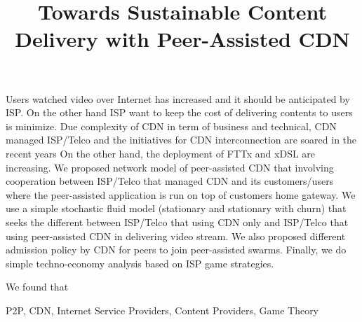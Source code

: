 \documentclass[paper]{ieice}
\title{Towards Sustainable Content Delivery with Peer-Assisted CDN}
\begin{document}
\maketitle

\begin{summary}
Users watched video over Internet has increased and it should be anticipated by ISP.  
On the other hand ISP want to keep the cost of delivering contents to users is minimize.
Due complexity of CDN in term of business and technical, CDN managed ISP/Telco and the initiatives for CDN interconnection are soared in the recent years
On the other hand, the deployment of FTTx and xDSL are increasing.  
We proposed network model of peer-assisted CDN that involving cooperation between ISP/Telco that managed CDN and its customers/users where the peer-assisted application is run on top of customers home gateway.  
We use a simple stochastic fluid model (stationary and stationary with churn) that seeks the different between ISP/Telco that using CDN only and ISP/Telco that using peer-assisted CDN in delivering video stream. We also proposed different admission policy by CDN for peers to join peer-assisted swarms.  
Finally, we do simple techno-economy analysis based on ISP game strategies. 

We found that 


\end{summary}
\begin{keywords}
P2P, CDN, Internet Service Providers, Content Providers, Game Theory 
\end{keywords}  

\end{document}
